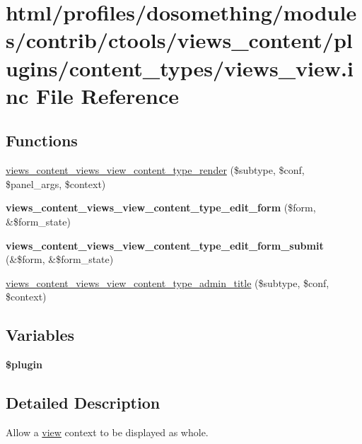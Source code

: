 \hypertarget{views__view_8inc}{
\section{html/profiles/dosomething/modules/contrib/ctools/views\_\-content/plugins/content\_\-types/views\_\-view.inc File Reference}
\label{views__view_8inc}
}
\subsection*{Functions}
\begin{DoxyCompactItemize}
\item 
\hyperlink{views__view_8inc_a57e0e0e5cb37e1d7e9886514356188f3}{views\_\-content\_\-views\_\-view\_\-content\_\-type\_\-render} (\$subtype, \$conf, \$panel\_\-args, \$context)
\item 
\hypertarget{views__view_8inc_ad04be2088eb44d842ffd1e76f7404a1e}{
{\bfseries views\_\-content\_\-views\_\-view\_\-content\_\-type\_\-edit\_\-form} (\$form, \&\$form\_\-state)}
\label{views__view_8inc_ad04be2088eb44d842ffd1e76f7404a1e}

\item 
\hypertarget{views__view_8inc_af7117a21dbcd39245d1c4cbd23f0b7d7}{
{\bfseries views\_\-content\_\-views\_\-view\_\-content\_\-type\_\-edit\_\-form\_\-submit} (\&\$form, \&\$form\_\-state)}
\label{views__view_8inc_af7117a21dbcd39245d1c4cbd23f0b7d7}

\item 
\hyperlink{views__view_8inc_a6bee99a3c0e1579869362a62deeae961}{views\_\-content\_\-views\_\-view\_\-content\_\-type\_\-admin\_\-title} (\$subtype, \$conf, \$context)
\end{DoxyCompactItemize}
\subsection*{Variables}
\begin{DoxyCompactItemize}
\item 
{\bfseries \$plugin}
\end{DoxyCompactItemize}


\subsection{Detailed Description}
Allow a \hyperlink{classview}{view} context to be displayed as whole. 

